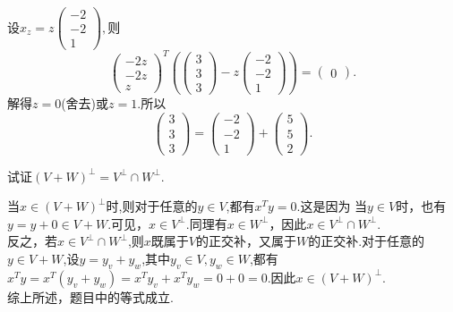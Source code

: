 ﻿\documentclass{book} \usepackage{exsheets} \usepackage{xeCJK}
\begin{document}
\begin{solution}
设$x_{z}=z
\begin{pmatrix}
  -2\\
  -2\\
  1
\end{pmatrix}, $则
$$
\begin{pmatrix}
  -2z\\
  -2z\\
  z
\end{pmatrix}^{T} \left(\begin{pmatrix}
    3\\
    3\\
    3
  \end{pmatrix}-z
  \begin{pmatrix}
    -2\\
    -2\\
    1
  \end{pmatrix}\right)=
\begin{pmatrix}
  0
\end{pmatrix}.
$$
解得$z=0$(舍去)或$z=1$.所以
$$
\begin{pmatrix}
  3\\
  3\\
  3
\end{pmatrix}=
\begin{pmatrix}
  -2\\
  -2\\
  1
\end{pmatrix}+
\begin{pmatrix}
  5\\
  5\\
  2
\end{pmatrix}.
$$
\end{solution}
\begin{question}
  试证$(V+W)^{\bot}=V^{\bot}\cap W^{\bot}$.
\end{question}
\begin{solution}
  当$x\in (V+W)^{\bot}$时,则对于任意的$y\in V$,都有$x^{T}y=0$.这是因为
  当$y\in V$时，也有$y=y+0\in V+W$.可见，$x\in V^{\bot}$.同理有$x\in
  W^{\bot}$，因此$x\in V^{\bot}\cap W^{\bot}$.\\

  反之，若$x\in V^{\bot}\cap
  W^{\bot}$,则$x$既属于$V$的正交补，又属于$W$的正交补.对于任意的$y\in
  V+W$,设$y=y_v+y_{w}$,其中$y_{v}\in V,y_{w}\in
  W$,都有$x^Ty=x^T(y_{v}+y_{w})=x^Ty_{v}+x^{T}y_{w}=0+0=0$.因此$x\in
  (V+W)^{\bot}$.\\

  综上所述，题目中的等式成立.
\end{solution}
\end{document}
